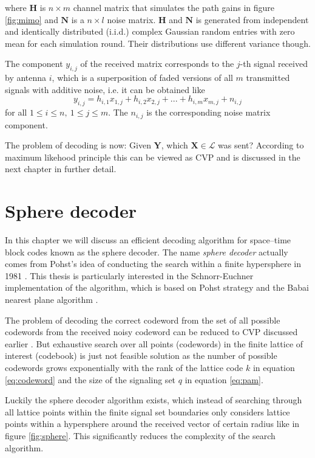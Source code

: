 \documentclass[english,12pt,a4paper,pdftex,sci,utf8]{aaltothesis}
\begin{document}
where $\mathbf{H}$ is $n \times m$ channel matrix that simulates the path gains in figure \ref{fig:mimo} and $\mathbf{N}$ is a $n\times l$ noise matrix. $\mathbf{H}$ and $\mathbf{N}$ is generated from independent and identically distributed  (i.i.d.) complex Gaussian random entries with zero mean for each simulation round. Their distributions use different variance though. 
\par The component $y_{i,j}$ of the received matrix corresponds to the $j$-th signal received by antenna $i$, which is a superposition of faded versions of all $m$ transmitted signals with additive noise, i.e. it can be obtained like
\begin{equation}
y_{i,j} = h_{i,1}x_{1,j}+h_{i,2}x_{2,j}+...+h_{i,m}x_{m,j}+n_{i,j}   
\label{eq:component}
\end{equation}
for all $1 \leq i \leq n, \ 1 \leq j \leq m$. The $n_{i,j}$ is the corresponding noise matrix component.
\par The problem of decoding is now: Given $\mathbf{Y}$, which $\mathbf{X} \in \mathcal{L}$ was sent? According to maximum likehood principle this can be viewed as CVP \cite{mia} and is discussed in the next chapter in further detail.

\clearpage

\section{Sphere decoder}
\label{sec:sphdec}
In this chapter we will discuss an efficient decoding algorithm for space--time block codes known as the sphere decoder. The name \emph{sphere decoder} actually comes from Pohst's idea of conducting the search within a finite hypersphere in 1981 \cite{agrell}. This thesis is particularly interested in the Schnorr-Euchner implementation of the algorithm, which is based on Pohst strategy and the Babai nearest plane algorithm \cite{agrell}. 
\par The problem of decoding the correct codeword from the set of all possible codewords from the received noisy codeword can be reduced to CVP discussed earlier \cite{mia}. But exhaustive search over all points (codewords) in the finite lattice of interest (codebook) is just not feasible solution as the number of possible codewords grows exponentially with the rank of the lattice code $k$ in equation \eqref{eq:codeword} and the size of the signaling set $q$ in equation \eqref{eq:pam}. 
\par Luckily the sphere decoder algorithm exists, which instead of searching through all lattice points within the finite signal set boundaries only considers lattice points within a hypersphere around the received vector of certain radius like in figure \ref{fig:sphere}. This significantly reduces the complexity of the search algorithm. 
\end{document}
